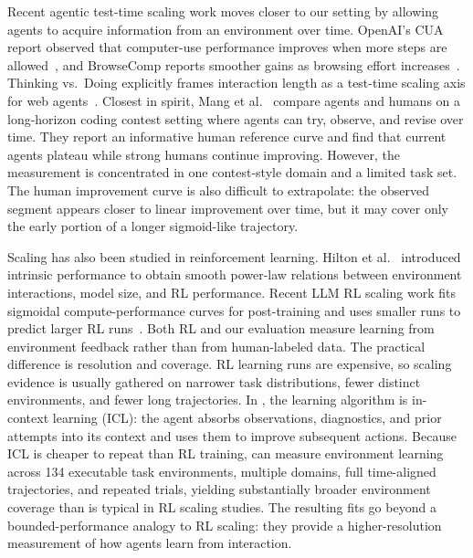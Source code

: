 Recent agentic test-time scaling work moves closer to our setting by allowing agents to acquire information from an environment over time. OpenAI's CUA report observed that computer-use performance improves when more steps are allowed~\cite{openai2025cua}, and BrowseComp reports smoother gains as browsing effort increases~\cite{openai2025browsecomp}. Thinking vs.\ Doing explicitly frames interaction length as a test-time scaling axis for web agents~\cite{shen2025thinkingdoing}. Closest in spirit, Mang et al.~\cite{mang2026humansstillbeatai} compare agents and humans on a long-horizon coding contest setting where agents can try, observe, and revise over time. They report an informative human reference curve and find that current agents plateau while strong humans continue improving. However, the measurement is concentrated in one contest-style domain and a limited task set. The human improvement curve is also difficult to extrapolate: the observed segment appears closer to linear improvement over time, but it may cover only the early portion of a longer sigmoid-like trajectory.

Scaling has also been studied in reinforcement learning. Hilton et al.~\cite{hilton2023rlscaling} introduced intrinsic performance to obtain smooth power-law relations between environment interactions, model size, and RL performance. Recent LLM RL scaling work fits sigmoidal compute-performance curves for post-training and uses smaller runs to predict larger RL runs~\cite{khatri2025scalingrlcompute}. Both RL and our evaluation measure learning from environment feedback rather than from human-labeled data. The practical difference is resolution and coverage. RL learning runs are expensive, so scaling evidence is usually gathered on narrower task distributions, fewer distinct environments, and fewer long trajectories. In \benchmark{}, the learning algorithm is in-context learning (ICL): the agent absorbs observations, diagnostics, and prior attempts into its context and uses them to improve subsequent actions. Because ICL is cheaper to repeat than RL training, \benchmark{} can measure environment learning across 134 executable task environments, multiple domains, full time-aligned trajectories, and repeated trials, yielding substantially broader environment coverage than is typical in RL scaling studies. The resulting fits go beyond a bounded-performance analogy to RL scaling: they provide a higher-resolution measurement of how agents learn from interaction.
